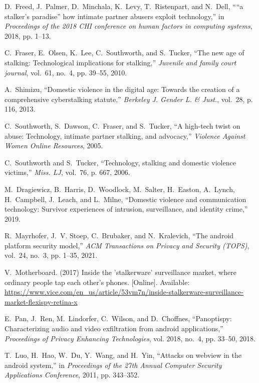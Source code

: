 \documentclass[sigconf,balance=false]{acmart}
\begin{document}
\begin{thebibliography}{100}
D.~Freed, J.~Palmer, D.~Minchala, K.~Levy, T.~Ristenpart, and N.~Dell, ``“a
  stalker's paradise” how intimate partner abusers exploit technology,'' in
  \emph{Proceedings of the 2018 CHI conference on human factors in computing
  systems}, 2018, pp. 1--13.

C.~Fraser, E.~Olsen, K.~Lee, C.~Southworth, and S.~Tucker, ``The new age of
  stalking: Technological implications for stalking,'' \emph{Juvenile and
  family court journal}, vol.~61, no.~4, pp. 39--55, 2010.

A.~Shimizu, ``Domestic violence in the digital age: Towards the creation of a
  comprehensive cyberstalking statute,'' \emph{Berkeley J. Gender L. \& Just.},
  vol.~28, p. 116, 2013.

C.~Southworth, S.~Dawson, C.~Fraser, and S.~Tucker, ``A high-tech twist on
  abuse: Technology, intimate partner stalking, and advocacy,'' \emph{Violence
  Against Women Online Resources}, 2005.

C.~Southworth and S.~Tucker, ``Technology, stalking and domestic violence
  victims,'' \emph{Miss. LJ}, vol.~76, p. 667, 2006.

M.~Dragiewicz, B.~Harris, D.~Woodlock, M.~Salter, H.~Easton, A.~Lynch,
  H.~Campbell, J.~Leach, and L.~Milne, ``Domestic violence and communication
  technology: Survivor experiences of intrusion, surveillance, and identity
  crime,'' 2019.

R.~Mayrhofer, J.~V. Stoep, C.~Brubaker, and N.~Kralevich, ``The android
  platform security model,'' \emph{ACM Transactions on Privacy and Security
  (TOPS)}, vol.~24, no.~3, pp. 1--35, 2021.

\BIBentryALTinterwordspacing
V.~Motherboard. (2017) Inside the 'stalkerware' surveillance market, where
  ordinary people tap each other's phones. [Online]. Available:
  \url{https://www.vice.com/en_us/article/53vm7n/inside-stalkerware-surveillance-market-flexispy-retina-x}
\BIBentrySTDinterwordspacing

E.~Pan, J.~Ren, M.~Lindorfer, C.~Wilson, and D.~Choffnes, ``Panoptispy:
  Characterizing audio and video exfiltration from android applications,''
  \emph{Proceedings of Privacy Enhancing Technologies}, vol. 2018, no.~4, pp.
  33--50, 2018.

T.~Luo, H.~Hao, W.~Du, Y.~Wang, and H.~Yin, ``Attacks on webview in the android
  system,'' in \emph{Proceedings of the 27th Annual Computer Security
  Applications Conference}, 2011, pp. 343--352.


\end{thebibliography}
\end{document}
